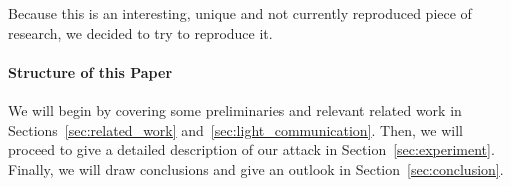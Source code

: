 Because this is an interesting, unique and not currently reproduced piece of research, we decided to try to reproduce it.

\paragraph{Structure of this Paper}%
\label{par:structure_of_this_paper}
We will begin by covering some preliminaries and relevant related work in Sections~\ref{sec:related_work} and~\ref{sec:light_communication}.
Then, we will proceed to give a detailed description of our attack in Section~\ref{sec:experiment}.
Finally, we will draw conclusions and give an outlook in Section~\ref{sec:conclusion}.

